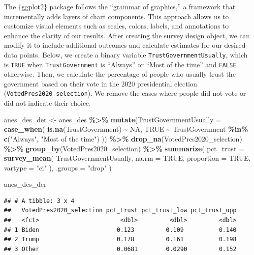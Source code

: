 \documentclass[
]{krantz}
\makeatletter
\newenvironment{Shaded}{\begin{snugshade}}{\end{snugshade}}
\newcommand{\AttributeTok}[1]{\textcolor[rgb]{0.27,0.27,0.27}{#1}}
\newcommand{\ConstantTok}[1]{\textcolor[rgb]{0.37,0.37,0.37}{#1}}
\newcommand{\FunctionTok}[1]{\textcolor[rgb]{0.27,0.27,0.27}{\textbf{#1}}}
\newcommand{\NormalTok}[1]{#1}
\newcommand{\OtherTok}[1]{\textcolor[rgb]{0.37,0.37,0.37}{#1}}
\newcommand{\SpecialCharTok}[1]{\textcolor[rgb]{0.43,0.43,0.43}{\textbf{#1}}}
\newcommand{\StringTok}[1]{\textcolor[rgb]{0.5,0.5,0.5}{#1}}
\newenvironment{kframe}{%
\medskip{}
\setlength{\fboxsep}{.8em}
 \def\at@end@of@kframe{}%
 \ifinner\ifhmode%
  \def\at@end@of@kframe{\end{minipage}}%
  \begin{minipage}{\columnwidth}%
 \fi\fi%
 \def\FrameCommand##1{\hskip\@totalleftmargin \hskip-\fboxsep
 \colorbox{shadecolor}{##1}\hskip-\fboxsep
     \hskip-\linewidth \hskip-\@totalleftmargin \hskip\columnwidth}%
 \MakeFramed {\advance\hsize-\width
   \@totalleftmargin\z@ \linewidth\hsize
   \@setminipage}}%
 {\par\unskip\endMakeFramed%
 \at@end@of@kframe}
\renewenvironment{Shaded}{\begin{kframe}}{\end{kframe}}
\makeatother
\begin{document}
The \{ggplot2\} package follows the ``grammar of graphics,'' a framework that incrementally adds layers of chart components. This approach allows us to customize visual elements such as scales, colors, labels, and annotations to enhance the clarity of our results. After creating the survey design object, we can modify it to include additional outcomes and calculate estimates for our desired data points. Below, we create a binary variable \texttt{TrustGovernmentUsually}, which is \texttt{TRUE} when \texttt{TrustGovernment} is ``Always'' or ``Most of the time'' and \texttt{FALSE} otherwise. Then, we calculate the percentage of people who usually trust the government based on their vote in the 2020 presidential election (\texttt{VotedPres2020\_selection}). We remove the cases where people did not vote or did not indicate their choice.

\begin{Shaded}
\begin{Highlighting}[]
\NormalTok{anes\_des\_der }\OtherTok{\textless{}{-}}\NormalTok{ anes\_des }\SpecialCharTok{\%\textgreater{}\%}
  \FunctionTok{mutate}\NormalTok{(}\AttributeTok{TrustGovernmentUsually =} \FunctionTok{case\_when}\NormalTok{(}
    \FunctionTok{is.na}\NormalTok{(TrustGovernment) }\SpecialCharTok{\textasciitilde{}} \ConstantTok{NA}\NormalTok{,}
    \ConstantTok{TRUE} \SpecialCharTok{\textasciitilde{}}\NormalTok{ TrustGovernment }\SpecialCharTok{\%in\%} \FunctionTok{c}\NormalTok{(}\StringTok{"Always"}\NormalTok{, }\StringTok{"Most of the time"}\NormalTok{)}
\NormalTok{  )) }\SpecialCharTok{\%\textgreater{}\%}
  \FunctionTok{drop\_na}\NormalTok{(VotedPres2020\_selection) }\SpecialCharTok{\%\textgreater{}\%}
  \FunctionTok{group\_by}\NormalTok{(VotedPres2020\_selection) }\SpecialCharTok{\%\textgreater{}\%}
  \FunctionTok{summarize}\NormalTok{(}
    \AttributeTok{pct\_trust =} \FunctionTok{survey\_mean}\NormalTok{(}
\NormalTok{      TrustGovernmentUsually,}
      \AttributeTok{na.rm =} \ConstantTok{TRUE}\NormalTok{,}
      \AttributeTok{proportion =} \ConstantTok{TRUE}\NormalTok{,}
      \AttributeTok{vartype =} \StringTok{"ci"}
\NormalTok{    ),}
    \AttributeTok{.groups =} \StringTok{"drop"}
\NormalTok{  )}

\NormalTok{anes\_des\_der}
\end{Highlighting}
\end{Shaded}

\begin{verbatim}
## # A tibble: 3 x 4
##   VotedPres2020_selection pct_trust pct_trust_low pct_trust_upp
##   <fct>                       <dbl>         <dbl>         <dbl>
## 1 Biden                      0.123         0.109          0.140
## 2 Trump                      0.178         0.161          0.198
## 3 Other                      0.0681        0.0290         0.152
\end{verbatim}
\end{document}
